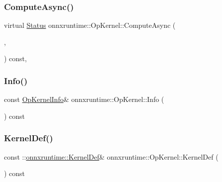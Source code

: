 \mbox{\label{classonnxruntime_1_1OpKernel_a3194116c5df2743d214f83412667f28e}} 
\subsubsection{\texorpdfstring{Compute\+Async()}{ComputeAsync()}}
{\footnotesize\ttfamily virtual \mbox{\hyperlink{classonnxruntime_1_1common_1_1Status}{Status}} onnxruntime\+::\+Op\+Kernel\+::\+Compute\+Async (\begin{DoxyParamCaption}\item[{\mbox{\hyperlink{classonnxruntime_1_1OpKernelContext}{Op\+Kernel\+Context}} $\ast$}]{,  }\item[{\mbox{\hyperlink{classonnxruntime_1_1OpKernel_adee0f70567925d90c35b3c5b92ee87ac}{Done\+Callback}}}]{ }\end{DoxyParamCaption}) const\hspace{0.3cm}{\ttfamily [inline]}, {\ttfamily [virtual]}}

\mbox{\label{classonnxruntime_1_1OpKernel_a6eaab44623ad2e38113f3411660af9f0}} 
\subsubsection{\texorpdfstring{Info()}{Info()}}
{\footnotesize\ttfamily const \mbox{\hyperlink{classonnxruntime_1_1OpKernelInfo}{Op\+Kernel\+Info}}\& onnxruntime\+::\+Op\+Kernel\+::\+Info (\begin{DoxyParamCaption}{ }\end{DoxyParamCaption}) const\hspace{0.3cm}{\ttfamily [inline]}}

\mbox{\label{classonnxruntime_1_1OpKernel_ab0ee459317ba9184f242c904afb2f381}} 
\subsubsection{\texorpdfstring{Kernel\+Def()}{KernelDef()}}
{\footnotesize\ttfamily const \+::\mbox{\hyperlink{classonnxruntime_1_1KernelDef}{onnxruntime\+::\+Kernel\+Def}}\& onnxruntime\+::\+Op\+Kernel\+::\+Kernel\+Def (\begin{DoxyParamCaption}{ }\end{DoxyParamCaption}) const\hspace{0.3cm}{\ttfamily [inline]}}

